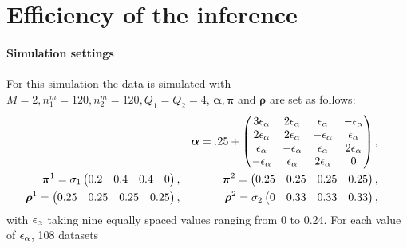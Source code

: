 \hypertarget{efficiency-of-the-inference}{%
\section{Efficiency of the
inference}\label{efficiency-of-the-inference}}

\paragraph{Simulation settings}

For this simulation the data is simulated with
\(M = 2, n_{1}^{m} = 120, n_{2}^{m} = 120, Q_1 = Q_2 = 4\),
\(\bm{\alpha}, \bm{\pi}\) and \(\bm{\rho}\) are set as follows:
\begin{align*}
    &&\bm{\alpha} = .25 +
                    \begin{pmatrix}
                        3 \eps[\alpha] & 2 \eps[\alpha] & \eps[\alpha] & - \eps[\alpha]\\
                        2 \eps[\alpha] & 2 \eps[\alpha] & - \eps[\alpha] & \eps[\alpha]\\
                        \eps[\alpha] & - \eps[\alpha] & \eps[\alpha] & 2 \eps[\alpha]\\
                        - \eps[\alpha] & \eps[\alpha] & 2 \eps[\alpha] & 0
                    \end{pmatrix}, \\ \bm{\pi}^1 = \sigma_1
                    \begin{pmatrix}
                        0.2 & 0.4 & 0.4 & 0
                    \end{pmatrix},
                    && \bm{\pi}^2 =
                    \begin{pmatrix}
                        0.25 & 0.25 & 0.25 & 0.25
                    \end{pmatrix}, \\
                    \bm{\rho}^1 =
                    \begin{pmatrix}
                        0.25 & 0.25 & 0.25 & 0.25
                    \end{pmatrix}, &&
                    \bm{\rho}^2 = \sigma_2
                    \begin{pmatrix}
                        0 & 0.33 & 0.33 & 0.33
                    \end{pmatrix}, &&
\end{align*} with \(\eps[\alpha]\) taking nine equally spaced values
ranging from 0 to 0.24. For each value of \(\eps[\alpha]\), 108 datasets
